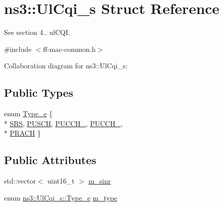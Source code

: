 \hypertarget{structns3_1_1UlCqi__s}{}\section{ns3\+:\+:Ul\+Cqi\+\_\+s Struct Reference}
\label{structns3_1_1UlCqi__s}


See section 4.. ul\+C\+QI.  




{\ttfamily \#include $<$ff-\/mac-\/common.\+h$>$}



Collaboration diagram for ns3\+:\+:Ul\+Cqi\+\_\+s\+:
\subsection*{Public Types}
\begin{DoxyCompactItemize}
\item 
enum \hyperlink{structns3_1_1UlCqi__s_aece9e5ebea42eb9ff1744c72c8459b57}{Type\+\_\+e} \{ \\*
\hyperlink{structns3_1_1UlCqi__s_aece9e5ebea42eb9ff1744c72c8459b57af4b6dba4243636562c910c4d4761dd7e}{S\+RS}, 
\hyperlink{structns3_1_1UlCqi__s_aece9e5ebea42eb9ff1744c72c8459b57a9716b20a3095c473ae3fde1eb5d0bb63}{P\+U\+S\+CH}, 
\hyperlink{structns3_1_1UlCqi__s_aece9e5ebea42eb9ff1744c72c8459b57a05ca6554bc6fcd96a0a51fbaa8e794c7}{P\+U\+C\+C\+H\+\_}, 
\hyperlink{structns3_1_1UlCqi__s_aece9e5ebea42eb9ff1744c72c8459b57a35664b4bda6f1cd6acfe9edc84c7571d}{P\+U\+C\+C\+H\+\_}, 
\\*
\hyperlink{structns3_1_1UlCqi__s_aece9e5ebea42eb9ff1744c72c8459b57af93f36792cb1eed08f6119e4abfe58e8}{P\+R\+A\+CH}
 \}
\end{DoxyCompactItemize}
\subsection*{Public Attributes}
\begin{DoxyCompactItemize}
\item 
std\+::vector$<$ uint16\+\_\+t $>$ \hyperlink{structns3_1_1UlCqi__s_ab561bf996ff15ef06eddc1d8fcf6303d}{m\+\_\+sinr}
\item 
enum \hyperlink{structns3_1_1UlCqi__s_aece9e5ebea42eb9ff1744c72c8459b57}{ns3\+::\+Ul\+Cqi\+\_\+s\+::\+Type\+\_\+e} \hyperlink{structns3_1_1UlCqi__s_a65a50b31dea8123fb77cf2994fb4601d}{m\+\_\+type}
\end{DoxyCompactItemize}



